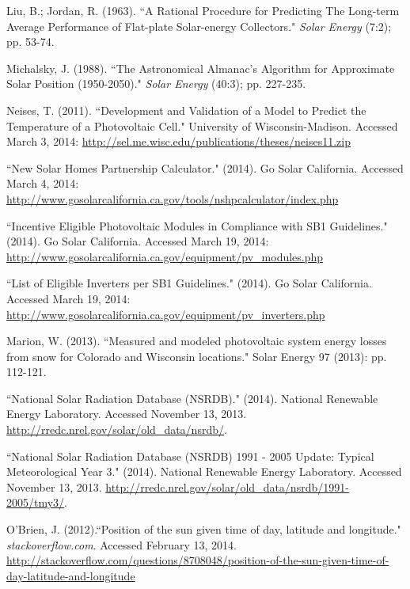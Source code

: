 \documentclass[12pt,letterpaper]{article}
\begin{document}
\begin{thebibliography}{99}
 Liu, B.; Jordan, R. (1963). ``A Rational Procedure for Predicting The Long-term Average Performance of Flat-plate Solar-energy Collectors." \textit{Solar Energy} (7:2); pp. 53-74.

 Michalsky, J. (1988). ``The Astronomical Almanac's Algorithm for Approximate Solar Position (1950-2050)." \textit{Solar Energy} (40:3); pp. 227-235.

 Neises, T. (2011). ``Development and Validation of a Model to Predict the Temperature of a Photovoltaic Cell." University of Wisconsin-Madison. Accessed March 3, 2014: \url{http://sel.me.wisc.edu/publications/theses/neises11.zip}

 ``New Solar Homes Partnership Calculator." (2014). Go Solar California. Accessed March 4, 2014: \url{http://www.gosolarcalifornia.ca.gov/tools/nshpcalculator/index.php}

 ``Incentive Eligible Photovoltaic Modules in Compliance with SB1 Guidelines." (2014). Go Solar California. Accessed March 19, 2014:
 \url{http://www.gosolarcalifornia.ca.gov/equipment/pv_modules.php}

 ``List of Eligible Inverters per SB1 Guidelines." (2014). Go Solar California. Accessed March 19, 2014:
 \url{http://www.gosolarcalifornia.ca.gov/equipment/pv_inverters.php}

 Marion, W. (2013). ``Measured and modeled photovoltaic system energy losses from snow for Colorado and Wisconsin locations." Solar Energy 97 (2013): pp. 112-121.

 ``National Solar Radiation Database (NSRDB)." (2014). National Renewable Energy Laboratory.  Accessed November 13, 2013. \url{http://rredc.nrel.gov/solar/old_data/nsrdb/}.

 ``National Solar Radiation Database (NSRDB) 1991 - 2005 Update: Typical Meteorological Year 3." (2014). National Renewable Energy Laboratory. Accessed November 13, 2013. \url{http://rredc.nrel.gov/solar/old\_data/nsrdb/1991-2005/tmy3/}.

 O'Brien, J. (2012).``Position of the sun given time of day, latitude and longitude." \textit{stackoverflow.com}. Accessed February 13, 2014. \url{http://stackoverflow.com/questions/8708048/position-of-the-sun-given-time-of-day-latitude-and-longitude}


\end{thebibliography}
\end{document}
